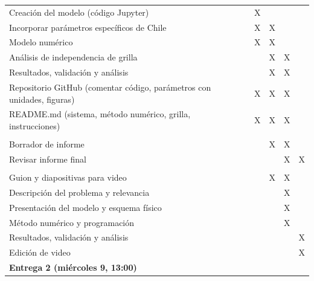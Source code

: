 \documentclass[11pt,a4paper]{article}
\begin{document}
\begin{tabularx}{\textwidth}{@{}>{\raggedright\arraybackslash}X *{6}{c}@{}}
Creación del modelo (código Jupyter) & & & X & & & \\
Incorporar parámetros específicos de Chile & & & X & X & & \\
Modelo numérico & & & X & X & & \\
Análisis de independencia de grilla & & & & X & X & \\
Resultados, validación y análisis & & & & X & X & \\
Repositorio GitHub (comentar código, parámetros con unidades, figuras) & & & X & X & X & \\
README.md (sistema, método numérico, grilla, instrucciones) & & & X & X & X & \\
\midrule
\multicolumn{7}{@{}l}{\textit{Informe}} \\
Borrador de informe & & & & X & X & \\
Revisar informe final & & & & & X & X \\
\midrule
\multicolumn{7}{@{}l}{\textit{Creación de video}} \\
Guion y diapositivas para video & & & & X & X & \\
Descripción del problema y relevancia & & & & & X & \\
Presentación del modelo y esquema físico & & & & & X & \\
Método numérico y programación & & & & & X & \\
Resultados, validación y análisis & & & & & & X \\
Edición de video & & & & & & X \\
\midrule
\textbf{Entrega 2 (miércoles 9, 13:00)} & & & & & & \\
\bottomrule
\end{tabularx}
\normalsize
\end{document}
